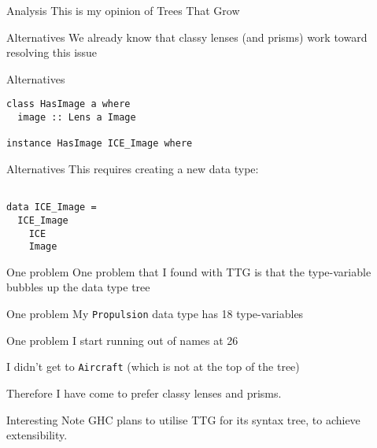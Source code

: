 \begin{frame}[fragile]
\begin{block}{Analysis}
This is my opinion of Trees That Grow
\end{block}
\end{frame}

\begin{frame}[fragile]
\begin{block}{Alternatives}
We already know that classy lenses (and prisms) work toward resolving this issue
\end{block}
\end{frame}

\begin{frame}[fragile]
\begin{block}{Alternatives}
\begin{lstlisting}[style=haskell]
class HasImage a where
  image :: Lens a Image

instance HasImage ICE_Image where
\end{lstlisting}
\end{block}
\end{frame}

\begin{frame}[fragile]
\begin{block}{Alternatives}
This requires creating a new data type:
\begin{lstlisting}[style=haskell]

data ICE_Image =
  ICE_Image
    ICE
    Image
\end{lstlisting}
\end{block}
\end{frame}

\begin{frame}[fragile]
\begin{block}{One problem}
One problem that I found with TTG is that the type-variable bubbles up the data type tree
\end{block}
\end{frame}

\begin{frame}[fragile]
\begin{block}{One problem}
My \lstinline{Propulsion} data type has 18 type-variables
\end{block}
\end{frame}

\begin{frame}[fragile]
\begin{block}{One problem}
I start running out of names at 26

I didn't get to \lstinline{Aircraft} (which is not at the top of the tree)
\end{block}
\end{frame}

\begin{frame}[fragile]
\begin{block}{Therefore}
I have come to prefer classy lenses and prisms.
\end{block}
\end{frame}

\begin{frame}[fragile]
\begin{block}{Interesting Note}
GHC plans to utilise TTG for its syntax tree, to achieve extensibility.
\end{block}
\end{frame}
